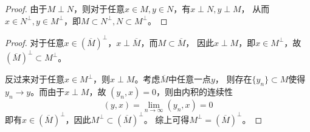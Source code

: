 \documentclass[cn]{homework}
\begin{document}
    \problem
    \begin{subproblem}
        \item
        \begin{proof}
        由于$M\perp N$，则对于任意$x\in M,y\in N$，有$x\perp N,y\perp M$，
        从而$x\in N^{\perp},y\in M^{\perp}$，即$M\subset N^{\perp},N\subset M^{\perp}$。
        \end{proof}

        \item
        \begin{proof}
            \newcommand{\cl}[1]{\overline{#1}}
            对于任意$x\in(\cl M)^{\perp}$，$x\perp\cl M$，而$M\subset\cl M$，
            因此$x\perp M$，即$x\in M^\perp$，故$(\cl M)^\perp\subset M^\perp$。

            反过来对于任意$x\in M^\perp$，则$x\perp M$。考虑$\cl M$中任意一点$y$，
            则存在$\{y_n\}\subset M$使得$y_n\to y$。而由于$x\perp M$，故
            $(y_n,x)=0$，则由内积的连续性
            \[(y,x)=\lim_{n\to\infty}(y_n,x)=0\]
            即有$x\in(\cl M)^\perp$，因此$M^\perp\subset(\cl M)^\perp$。
            综上可得$M^\perp=(\cl M)^\perp$。
        \end{proof}
        
    \end{subproblem}
\end{document}
